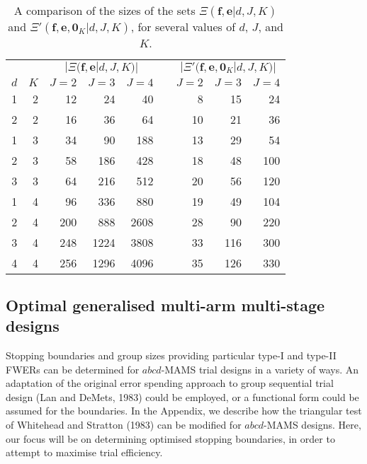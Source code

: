 \documentclass{article}
\numberwithin{equation}{section}
\theoremstyle{plain}
\begin{document}
\def\arraystretch{1.2}
\begin{table}[htb]
	\begin{center}
		\caption{A comparison of the sizes of the sets $\Xi(\boldsymbol{f},\boldsymbol{e}|d,J,K)$ and $\Xi'(\boldsymbol{f},\boldsymbol{e},\boldsymbol{0}_K|d,J,K)$, for several values of $d$, $J$, and $K$.}
		\label{tab1}
		\begin{tabular}{rrrrrrrrr}
			\hline
			& & \multicolumn{3}{c}{$|\Xi(\boldsymbol{f},\boldsymbol{e}|d,J,K)|$} && \multicolumn{3}{c}{$|\Xi'(\boldsymbol{f},\boldsymbol{e},\boldsymbol{0}_K|d,J,K)|$} \\
			\cline{3-5}\cline{7-9}
			$d$ & $K$ & $J=2$ & $J=3$ & $J=4$ && $J=2$ & $J=3$ & $J=4$\\
			\hline
			1 & 2 & 12 & 24 & 40 && 8 & 15 & 24 \\
			2 & 2 & 16 & 36 & 64 && 10 & 21 & 36 \\
			1 & 3 & 34 & 90 & 188 && 13 & 29 & 54 \\
			2 & 3 & 58 & 186 & 428 && 18 & 48 & 100 \\
			3 & 3 & 64 & 216 & 512 && 20 & 56 & 120 \\
			1 & 4 & 96 & 336 & 880 && 19 & 49 & 104\\
			2 & 4 & 200 & 888 & 2608 && 28 & 90 & 220 \\
			3 & 4 & 248 & 1224 & 3808 && 33 & 116 & 300 \\
			4 & 4 & 256 & 1296 & 4096 && 35 & 126 & 330 \\
			\hline
		\end{tabular}
	\end{center}
\end{table}

\subsection{Optimal generalised multi-arm multi-stage designs}\label{optimal}

Stopping boundaries and group sizes providing particular type-I and type-II FWERs can be determined for $abcd$-MAMS trial designs in a variety of ways. An adaptation of the original error spending approach to group sequential trial design (Lan and DeMets, 1983) could be employed, or a functional form could be assumed for the boundaries. In the Appendix, we describe how the triangular test of Whitehead and Stratton (1983) can be modified for $abcd$-MAMS designs. Here, our focus will be on determining optimised stopping boundaries, in order to attempt to maximise trial efficiency.
\end{document}
